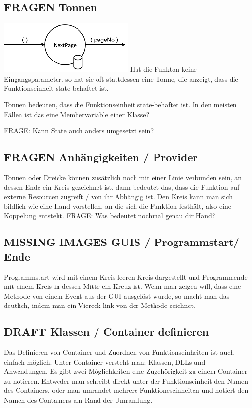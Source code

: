 \documentclass[11pt]{article}
\begin{document}
\subsection{{\bfseries\sffamily FRAGEN} Tonnen}
\label{sec:orgheadline28}

\includegraphics[width=.9\linewidth]{./img/diagramTonne.png}
Hat die Funkton keine Eingangsparameter, so hat sie oft stattdessen eine Tonne, die anzeigt, dass die Funktionseinheit state-behaftet ist.

Tonnen bedeuten, dass die Funktionseinheit state-behaftet ist.
In den meisten Fällen ist das eine Membervariable einer Klasse?

FRAGE: Kann State auch anders umgesetzt sein?
\subsection{{\bfseries\sffamily FRAGEN} Anhängigkeiten / Provider}
\label{sec:orgheadline29}

Tonnen oder Dreicke können zusätzlich noch mit einer Linie verbunden sein, an dessen Ende ein Kreis gezeichnet ist,
dann bedeutet das, dass die Funktion auf externe Resourcen zugreift / von ihr
Abhängig ist.
Den Kreis kann man sich bildlich wie eine Hand vorstellen, an die sich die
Funktion festhält, also eine Koppelung entsteht.
FRAGE: Was bedeutet nochmal genau dir Hand?

\subsection{{\bfseries\sffamily MISSING IMAGES} GUIS / Programmstart/ Ende}
\label{sec:orgheadline30}
Programmstart wird mit einem Kreis leeren Kreis dargestellt und Programmende mit
einem Kreis in dessen Mitte ein Kreuz ist.
Wenn man zeigen will, dass eine Methode von einem Event aus der GUI ausgelöst
wurde, so macht man das deutlich, indem man ein Viereck link von der Methode zeichnet.
\subsection{{\bfseries\sffamily DRAFT} Klassen / Container definieren}
\label{sec:orgheadline31}
Das Definieren von Container und Zuordnen von Funktionseinheiten ist auch
einfach möglich. Unter Container versteht man: Klassen, DLLs und Anwendungen.
Es gibt zwei Möglichkeiten eine Zugehörigkeit zu einem Container zu notieren.
Entweder man schreibt direkt unter der Funktionseinheit den Namen des
Containers, oder man umrandet mehrere Funktioneseinheiten und notiert den Namen
des Containers am Rand der Umrandung.
\end{document}

